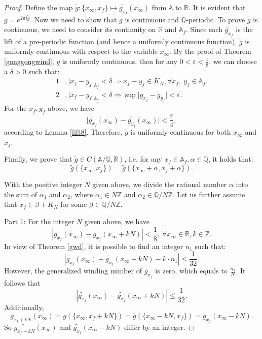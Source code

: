 \documentclass[10pt,a4paper]{amsart}
\newcommand{\A}{\mathbb{A}}
\begin{document}
\begin{proof}
Define the map \( \widetilde{g}: \{x_{\infty}, x_f\} \mapsto \widetilde{g_{x_f}}(x_\infty) \) from \( \A \) to \( \mathbb{R} \). It is evident that $g=e^{2\pi i \tilde{g}}.$ Now we need to show that $\tilde{g}$ is continuous and $\mathbb{Q}$-periodic. To prove $\tilde{g}$ is continuous, we need to consider its continuity on $\mathbb{R}$ and $\A_f$. Since each $\widetilde{g_{x_f}}$ is the lift of a pre-periodic function (and hence a uniformly continuous function), $\tilde{g}$ is uniformly continuous with respect to the variable $x_\infty$. By the proof of Theorem \ref{gonggongwind}, $g$ is uniformly continuous, then for any $0<\varepsilon<\frac{1}{8}$, we can choose a $\delta >0$ such that:
\begin{align}
    1&, \lvert x_f-y_f\rvert_{\A_f}<\delta \Rightarrow x_f-y_f\in K_N, \forall x_f,\ y_f\in \mathbb{A}_f.\\
    2&,\lvert x_f-y_f\rvert_{\A_f}<\delta \Rightarrow \sup\lvert g_{x_f}-g_{y_f}\rvert<\varepsilon.
\end{align}
For the $x_f,y_f$ above, we have
\[
\lvert \widetilde{g_{x_f}}(x_\infty)-\widetilde{g_{y_f}}(x_\infty)\rvert<\frac{\varepsilon}{4},
\]
according to Lemma \ref{lift8}. Therefore, $\tilde{g}$ is uniformly continuous for both $x_\infty$ and $x_f$.

Finally, we prove that \( \widetilde{g} \in C(\A / \mathbb{Q}, \mathbb{R}) \), i.e. for any \( x_f \in \A_f, \alpha\in\mathbb{Q} \), it holds that:
\[
\widetilde{g}(\{x_\infty, x_f\}) = \widetilde{g}(\{x_\infty + \alpha, x_f + \alpha\}).
\]

With the positive integer $N$ given above, we divide the rational number $\alpha$ into the sum of $\alpha_1$ and $\alpha_2$, where \( \alpha_1 \in N\mathbb{Z} \) and \( \alpha_2 \in \mathbb{Q} /N\mathbb{Z} \). Let us further assume that $x_f\in \beta +K_N$ for some $\beta\in \mathbb{Q}/N\mathbb{Z}$.

Part 1: For the integer $N$ given above, we have
\[
|g_{x_f}(x_\infty) - g_{x_f}(x_\infty + kN)| < \frac{1}{8}, \ \forall x_\infty \in \mathbb{R}, k \in \mathbb{Z}.
\]
In view of Theorem \ref{gwd}, it is possible to find an integer $n_1$ such that:
\[
|\widetilde{g_{x_f}}(x_\infty) - \widetilde{g_{x_f}}(x_\infty + kN)-k\cdot n_1| \leq \frac{1}{32}.
\]
However, the generalized winding number of \(g_{x_f}\) is zero, which equals to $\frac{n_1}{N}.$ It follows that 
\[
|\widetilde{g_{x_f}}(x_\infty) - \widetilde{g_{x_f}}(x_\infty + kN)| \leq \frac{1}{32}.
\]
Additionally, 
\[
g_{x_f + kN}(x_\infty) = g(\{x_\infty, x_f + kN\}) = g(\{ x_\infty - kN, x_f \})=g_{x_f}(x_{\infty}-kN).
\]
So \( \widetilde{g_{x_f+kN}}(x_\infty ) \) and \( \widetilde{g_{x_f}}(x_\infty-kN) \)  differ by an integer.


\end{proof}
\end{document}
